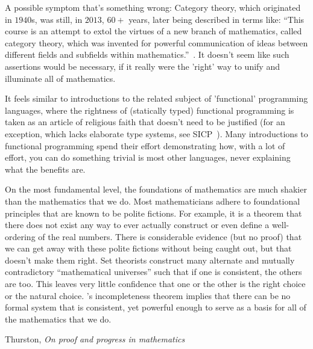 \documentclass[11pt]{book}
\begin{document}
A possible symptom that's something wrong:
Category theory, which originated in $1940$s,
was still, in $2013$, $60+$ years, later being described in terms like:
``This course is an attempt to extol the virtues of a new branch of mathematics,
called category theory, which was invented for powerful communication of ideas between
different fields and subfields within mathematics.''~\cite{spivakd_2013_cath_for_scientists}.
It doesn't seem like such assertions would be necessary,
if it really were the 'right' way to unify 
and illuminate all of mathematics.

It feels similar to introductions to the related subject of
'functional' programming languages,
where the rightness of (statically typed) functional programming 
is taken as
an article of religious faith that doesn't need to be justified
(for an exception, which lacks elaborate type systems,
see SICP~\cite{abelson1996sicp}).
Many introductions to functional programming spend their
effort demonstrating how, with a lot of effort, you can do
something trivial is most other languages,
never explaining what the benefits are.

\label{sec:Shaky-foundations}

\epigraph{On the most fundamental level, the foundations of mathematics are much shakier
than the mathematics that we do. Most mathematicians adhere to foundational
principles that are known to be polite fictions. For example, it is a theorem that
there does not exist any way to ever actually construct or even define a well-ordering
of the real numbers. There is considerable evidence (but no proof) that we can get
away with these polite fictions without being caught out, but that doesn’t make
them right. Set theorists construct many alternate and mutually contradictory
``mathematical universes'' such that if one is consistent, the others are too. This
leaves very little confidence that one or the other is the right choice or the natural
choice. {\Godel}’s incompleteness theorem implies that there can be no formal system
that is consistent, yet powerful enough to serve as a basis for all of the mathematics
that we do.}%
{Thurston, \textit{On proof and progress in mathematics}~\cite{thurston_1994_proof}}

\pagebreak
\end{document}
